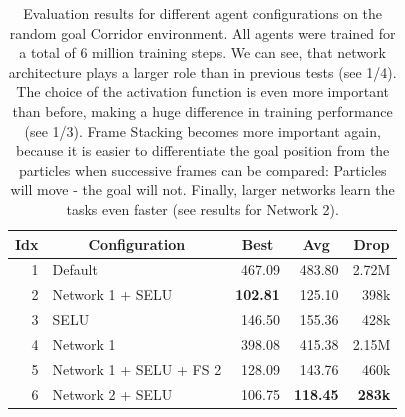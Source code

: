 \begin{table}[htp]
    \begin{center}
        \begin{tabular}{rlrrr}
            \toprule
            \multicolumn{1}{c}{Idx} & \multicolumn{1}{c}{Configuration} & \multicolumn{1}{c}{Best} & \multicolumn{1}{c}{Avg} & \multicolumn{1}{c}{Drop}\\
            \midrule
            1 & Default & 467.09 & 483.80 & 2.72M \\
            2 & Network 1 + SELU & \textbf{102.81} & 125.10 & 398k \\
            3 & SELU & 146.50 & 155.36 & 428k \\
            4 & Network 1 & 398.08 & 415.38 & 2.15M \\ 
            5 & Network 1 + SELU + FS 2 & 128.09 & 143.76 & 460k \\
            6 & Network 2 + SELU & 106.75 & \textbf{118.45} & \textbf{283k} \\
            \bottomrule
        \end{tabular}
    \end{center}
    \caption[Evaluation Results for Agents on the Random Goal Corridor Environment]{Evaluation results for different agent configurations on the random goal Corridor environment. All agents were trained for a total of 6 million training steps. We can see, that network architecture plays a larger role than in previous tests (see 1/4). The choice of the activation function is even more important than before, making a huge difference in training performance (see 1/3). Frame Stacking becomes more important again, because it is easier to differentiate the goal position from the particles when successive frames can be compared: Particles will move - the goal will not. Finally, larger networks learn the tasks even faster (see results for Network 2).} \label{tab:Eval/RandomGoal/Maze0318}
\end{table}

